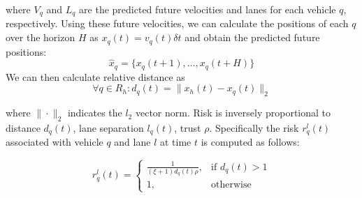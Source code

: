 \documentclass[letterpaper, 10 pt, conference]{ieeeconf}  %
\newcommand\NB[1]{$\spadesuit$\footnote{NB: #1}}
\newcommand\RP[1]{$\clubsuit$\footnote{RP: #1}}
\begin{document}

where $V_q$ and $L_q$ are the predicted future velocities and lanes for each vehicle $q$, respectively.
Using these future velocities, we can calculate the positions of each $q$ over the horizon $H$ as $x_q(t) = v_q(t)\delta t$ and obtain the predicted future positions:
\begin{equation}
    \hat{x}_q = \{x_q(t+1),\ldots,x_q(t+H)\}
\end{equation}
We can then calculate relative distance as
\begin{equation}
    \forall q \in R_h: d_q(t) = \lVert x_h(t)-x_q(t)\rVert_2
\end{equation}




where $\rVert \cdot \lVert_2$ indicates the $l_2$ vector norm. Risk is inversely proportional to distance $d_q(t)$, lane separation $l_q(t)$, trust $\rho$. Specifically the risk $r_q^l(t)$ associated with vehicle $q$ and lane $l$ at time $t$ is computed as follows: %

\begin{equation} \label{eq:riskcalc}
    r_{q}^{l}(t) =
    \begin{cases}
    \frac{1}{(\xi+1) d_{q}(t)\rho},  & \text{if } d_{q}(t) > 1  \\
        1,                     & \text{otherwise}  
    \end{cases}
\end{equation}
\end{document}

